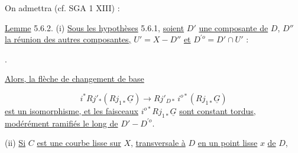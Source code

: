 On admettra (cf. SGA 1 XIII\hspace{2.5em}) :

\underline{Lemme} 5.6.2. (i) \underline{Sous les hypothèses} 5.6.1, \underline{soient} $D'$ \underline{une composante de} $D$, $D''$ \underline{la réunion des autres composantes,} $U' = X-D''$ \underline{et} $D^{\prime o} = D'\cap U'$ :

\begin{center}
\end{center}
.

\underline{Alors, la flèche de changement de base}

\begin{equation*}
i^* Rj'_* (Rj_{1*} \underline{G}) \longrightarrow Rj'_{D*}\, i^{o*} (Rj_{1*}\underline{G})
\end{equation*}
\underline{est un isomorphisme, et les faisceaux} $i^{o*}Rj_{1*}\underline{G}$ \underline{sont constant tordus, modérément ramifiés le long de} $D' - D^{\prime o}$.

(ii) \underline{Si} $C$ \underline{est une courbe lisse sur} $X$, \underline{transversale à} $D$ \underline{en un point lisse} $x$ \underline{de} $D$,

